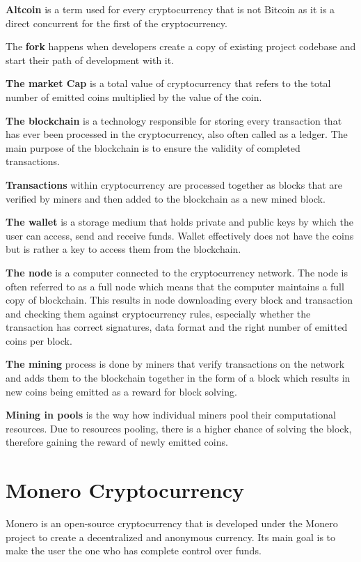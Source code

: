\documentclass[
  printed, %
  table,   %
  lof,     %
  lot,     %
           oneside, color
]{fithesis3}
\begin{document}
\textbf{Altcoin} is a term used for every cryptocurrency that is not Bitcoin as it is a direct concurrent for the first of the cryptocurrency.

The \textbf{fork} happens when developers create a copy of existing project codebase and start their path of development with it. 

\textbf{The market Cap} is a total value of cryptocurrency that refers to the total number of emitted coins multiplied by the value of the coin.

\textbf{The blockchain} is a technology responsible for storing every transaction that has ever been processed in the cryptocurrency, also often called as a ledger. The main purpose of the blockchain is to ensure the validity of completed transactions.

\textbf{Transactions} within cryptocurrency are processed together as blocks that are verified by miners and then added to the blockchain as a new mined block.

\textbf{The wallet} is a storage medium that holds private and public keys by which the user can access, send and receive funds. Wallet effectively does not have the coins but is rather a key to access them from the blockchain.

\textbf{The node} is a computer connected to the cryptocurrency network. The node is often referred to as a full node which means that the computer maintains a full copy of blockchain. This results in node downloading every block and transaction and checking them against cryptocurrency rules, especially whether the transaction has correct signatures, data format and the right number of emitted coins per block.

\textbf{The mining} process is done by miners that verify transactions on the network and adds them to the blockchain together in the form of a block which results in new coins being emitted as a reward for block solving.

\textbf{Mining in pools} is the way how individual miners pool their computational resources. Due to resources pooling, there is a higher chance of solving the block, therefore gaining the reward of newly emitted coins. %

\chapter{Monero Cryptocurrency}
Monero is an open-source cryptocurrency that is developed under the Monero project to create a decentralized and anonymous currency. Its main goal is to make the user the one who has complete control over funds.
\end{document}
